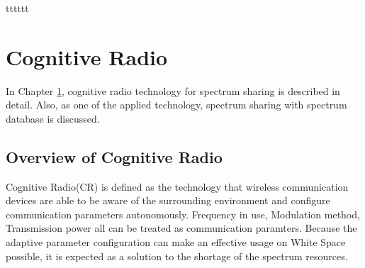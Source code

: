 tttttt\chapter[Cognitive Radio]{Cognitive Radio}
\label{chapter:CR}
In Chapter \ref{chapter:CR}, cognitive radio technology for spectrum sharing is described in detail. Also, as one of the applied technology, spectrum sharing with spectrum database is discussed.

\section{Overview of Cognitive Radio}
Cognitive Radio(CR) is defined as the technology that wireless communication devices are able to be aware of the surrounding environment and configure communication parameters autonomously. Frequency in use, Modulation method, Transmission power all can be treated as communication paramters. Because the adaptive parameter configuration can make an effective usage on White Space possible, it is expected as a solution to the shortage of the spectrum resources.

